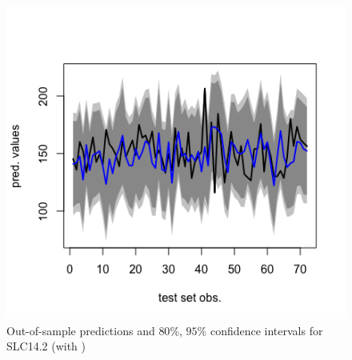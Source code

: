 \begin{figure}[!htb]
\begin{minipage}{0.5\textwidth}
        \includegraphics[width=1.064\linewidth, height=0.35\textheight]{gfx/chapter-bayesianrvfl/SLC14_2.png}
        \caption{Out-of-sample predictions and $80$\%, $95$\% confidence intervals for SLC14.2 (with )}
        \label{gfx/chapter-bayesianrvfl/oos_SLC14_2_seed123}
    \end{minipage}
\end{figure}
